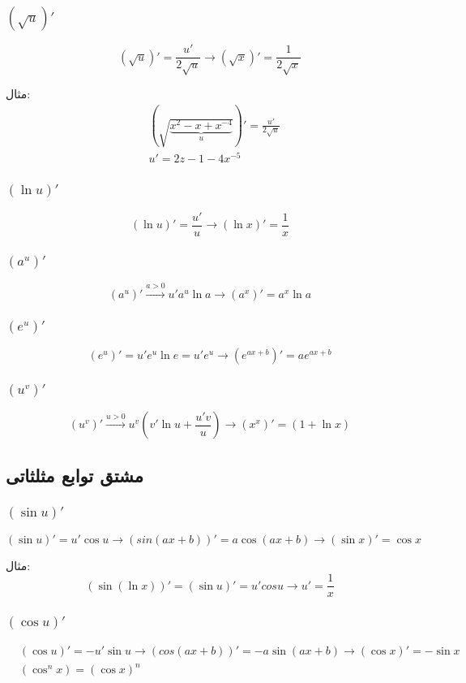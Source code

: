 \subsubsection{$(\sqrt{u})'$}
\[ (\sqrt{u})' = \frac{u'}{2\sqrt{u}} \to (\sqrt{x})' = \frac{1}{2\sqrt{x}} \]

مثال:
\begin{align*}
&(\sqrt{\underbrace{x^2-x+x^{-4}}_u})' = \frac{u'}{2\sqrt{u}} \\
&u' = 2z-1-4x^{-5}
\end{align*}

\subsubsection{$(\ln u)'$}
\[ (\ln u)' = \frac{u'}{u} \to (\ln x)' = \frac{1}{x} \]

\subsubsection{$(a^u)'$}
\[ (a^u)' \overset{a>0}{\longrightarrow} u'a^u\ln a \to (a^x)' = a^x\ln a \]

\subsubsection{$(e^u)'$}
\[ (e^u)' = u'e^u\ln e = u'e^u \to (e^{ax+b})' = ae^{ax+b} \]

\subsubsection{$(u^v)'$}
\[ (u^v)' \overset{u>0}{\longrightarrow} u^v(v'\ln u+\frac{u'v}{u}) \to (x^x)' = (1 + \ln x) \]


\subsection{مشتق توابع مثلثاتی}
\subsubsection{$(\sin u)'$}
\[ (\sin u)' = u'\cos u \longrightarrow (sin(ax+b))' = a \cos(ax+b) \longrightarrow (\sin x)' = \cos x \]

مثال:
\[ (\sin(\ln x))' = (\sin u)' = u'cosu \to u' = \frac{1}{x}\]

\subsubsection{$(\cos u)'$}
\begin{align*}
&(\cos u)' = -u'\sin u \longrightarrow (cos(ax+b))' = -a\sin(ax+b) \to (\cos x)' = -\sin x \\
&(\cos^n x) = (\cos x)^n \\
\end{align*}


